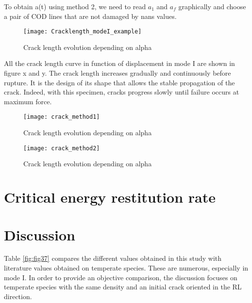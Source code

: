 To obtain a(t) using method 2, we need to read $a_1$ and $a_f$ graphically and choose a pair of COD lines that are not damaged by nans values.

\begin{figure}[htp]
	\centering
	\texttt{[image: Cracklength\_modeI\_example]}
	\caption{Crack length evolution depending on alpha}
	\label{fig:Cracklength_modeI_example}
\end{figure}

All the crack length curve in function of displacement in mode I are shown in figure x and y. The crack length increases gradually and continuously before rupture. It is the design of its shape that allows the stable propagation of the crack. Indeed, with this specimen, cracks progress slowly until failure occurs at maximum force.

\begin{figure}[htp]
	\centering
	\texttt{[image: crack\_method1]}
	\caption{Crack length evolution depending on alpha}
	\label{fig:Cracklength_modeI_example}
\end{figure}

\begin{figure}[htp]
	\centering
	\texttt{[image: crack\_method2]}
	\caption{Crack length evolution depending on alpha}
	\label{fig:Cracklength_modeI_example}
\end{figure}

\section{Critical energy restitution rate}

\section{Discussion}

Table \ref{fig:fig37} compares the different values obtained in this study with literature values obtained on temperate species. These are numerous, especially in mode I. In order to provide an objective comparison, the discussion focuses on temperate species with the same density and an initial crack oriented in the RL direction.


